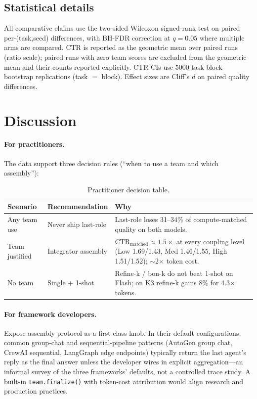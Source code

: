 \documentclass[sigconf,anonymous]{aamas}
\newcommand{\ctrm}{\mathrm{CTR}_{\text{matched}}}
\newcommand{\code}[1]{\texttt{#1}}
\begin{document}
\subsection{Statistical details}
\label{sec:stats}

All comparative claims use the two-sided Wilcoxon signed-rank test on paired per-(task,seed) differences, with BH-FDR correction at $q=0.05$ where multiple arms are compared. CTR is reported as the geometric mean over paired runs (ratio scale); paired runs with zero team scores are excluded from the geometric mean and their counts reported explicitly. CTR CIs use 5000 task-block bootstrap replications (task $=$ block). Effect sizes are Cliff's $d$ on paired quality differences.

\section{Discussion}
\label{sec:discussion}

\paragraph{For practitioners.} The data support three decision rules (``when to use a team and which assembly''):

\begin{table}[h]
\centering
\small
\caption{Practitioner decision table.}
\setlength{\tabcolsep}{3pt}
\begin{tabular}{llp{3.4cm}}
\toprule
Scenario & Recommendation & Why \\
\midrule
Any team use & Never ship last-role & Last-role loses 31--34\% of compute-matched quality on both models. \\
Team justified & Integrator assembly & $\ctrm \approx 1.5\times$ at every coupling level (Low 1.69/1.43, Med 1.46/1.55, High 1.51/1.52); $\sim$2$\times$ token cost. \\
No team & Single + 1-shot & Refine-k / bon-k do not beat 1-shot on Flash; on K3 refine-k gains 8\% for 4.3$\times$ tokens. \\
\bottomrule
\end{tabular}
\end{table}

\paragraph{For framework developers.} Expose assembly protocol as a first-class knob. In their default configurations, common group-chat and sequential-pipeline patterns (AutoGen group chat, CrewAI sequential, LangGraph edge endpoints) typically return the last agent's reply as the final answer unless the developer wires in explicit aggregation---an informal survey of the three frameworks' defaults, not a controlled trace study. A built-in \code{team.finalize()} with token-cost attribution would align research and production practices.
\end{document}
